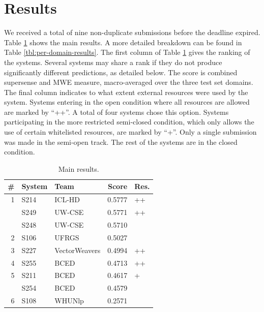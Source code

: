 \documentclass[11pt,letterpaper]{article}
\begin{document}
\section{Results}\label{sec:results}

We received a total of nine non-duplicate submissions before the deadline expired. 
Table \ref{tbl:main-results} shows the main results. A more detailed breakdown can be found in Table \ref{tbl:per-domain-results}. The first column of Table \ref{tbl:main-results} gives the ranking of the systems. Several systems may share a rank if they do not produce significantly different predictions, as detailed below. The score is combined supersense and MWE measure, macro-averaged over the three test set domains. The final column indicates to what extent external resources were used by the system. Systems entering in the open condition where all resources are allowed are marked by ``++''. A total of four systems chose this option. Systems participating in the more restricted semi-closed condition, which only allows the use of certain whitelisted resources, are marked by ``+''. Only a single submission was made in the semi-open track. The rest of the systems are in the closed condition. 

\begin{table}\small\centering
\begin{tabular}{rllrl}
\toprule
 \#   & System &           Team &  Score  & Res. \\
\midrule
    1 &   S214 &         ICL-HD &  0.5777 &   ++ \\
      &   S249 &         UW-CSE &  0.5771 &   ++ \\
      &   S248 &         UW-CSE &  0.5710 &      \\
    2 &   S106 &          UFRGS &  0.5027 &      \\
    3 &   S227 &  VectorWeavers &  0.4994 &   ++ \\
    4 &   S255 &           BCED &  0.4713 &   ++ \\
    5 &   S211 &           BCED &  0.4617 &    + \\
      &   S254 &           BCED &  0.4579 &      \\
    6 &   S108 &         WHUNlp &  0.2571 &      \\
\bottomrule
\end{tabular}

\caption{Main results.}

\label{tbl:main-results}
	
\end{table}
\end{document}

